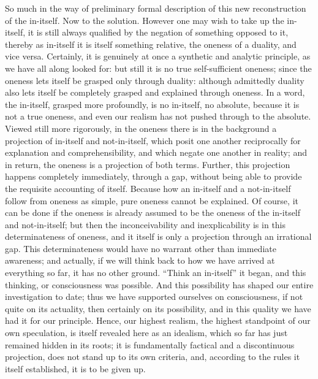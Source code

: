 So much in the way of preliminary formal description
of this new reconstruction of the in-itself.
Now to the solution.
However one may wish to take up the in-itself,
it is still always qualified by
the negation of something opposed to it,
thereby as in-itself it is itself something relative,
the oneness of a duality, and vice versa.
Certainly, it is genuinely at once
a synthetic and analytic principle,
as we have all along looked for:
but still it is no true self-sufficient oneness;
since the oneness lets itself be grasped only through duality:
although admittedly duality also lets itself be completely
grasped and explained through oneness.
In a word, the in-itself, grasped more profoundly,
is no in-itself, no absolute, because it is not a true oneness,
and even our realism has not pushed through to the absolute.
Viewed still more rigorously,
in the oneness there is in the background
a projection of in-itself and not-in-itself,
which posit one another reciprocally
for explanation and comprehensibility,
and which negate one another in reality;
and in return, the oneness is a projection of both terms.
Further, this projection happens completely immediately,
through a gap, without being able to provide
the requisite accounting of itself.
Because how an in-itself and a not-in-itself
follow from oneness as simple, pure oneness
cannot be explained.
Of course, it can be done if the oneness is already assumed to be
the oneness of the in-itself and not-in-itself;
but then the inconceivability
and inexplicability is in this determinateness of oneness,
and it itself is only a projection through an irrational gap.
This determinateness would have no warrant
other than immediate awareness;
and actually, if we will think back to
how we have arrived at everything so far,
it has no other ground.
“Think an in-itself” it began,
and this thinking, or consciousness was possible.
And this possibility has shaped our entire investigation to date;
thus we have supported ourselves on consciousness,
if not quite on its actuality,
then certainly on its possibility,
and in this quality we have had it for our principle.
Hence, our highest realism,
the highest standpoint of our own speculation,
is itself revealed here as an idealism,
which so far has just remained hidden in its roots;
it is fundamentally factical
and a discontinuous projection,
does not stand up to its own criteria,
and, according to the rules it itself established,
it is to be given up.

